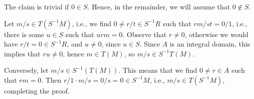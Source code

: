 The claim is trivial if $0 \in S$. Hence, in the remainder, we will
assume that $0\notin S$.

Let $m/s \in T(S^{-1}M)$, i.e., we find $0\neq r/t \in S^{-1}R$ such that $rm/st = 0/1$, i.e.,
there is some $u \in S$ such that $urm  = 0$. Observe that $r\neq 0$, otherwise we would
have $r/t = 0 \in S^{-1}R$, and $u\neq 0$, since $u\in S$. Since $A$ is an integral
domain, this implies that $ru\neq 0$, hence $m \in T(M)$, so
$m/s \in S^{-1}T(M)$.

Conversely, let $m/s \in S^{-1}(T(M))$. This means that we find $0\neq r \in A$ such
that $rm = 0$. Then $r/1 \cdot m/s = 0/s = 0 \in S^{-1}M$, i.e.,
$m/s \in T(S^{-1}M)$, completing the proof.

